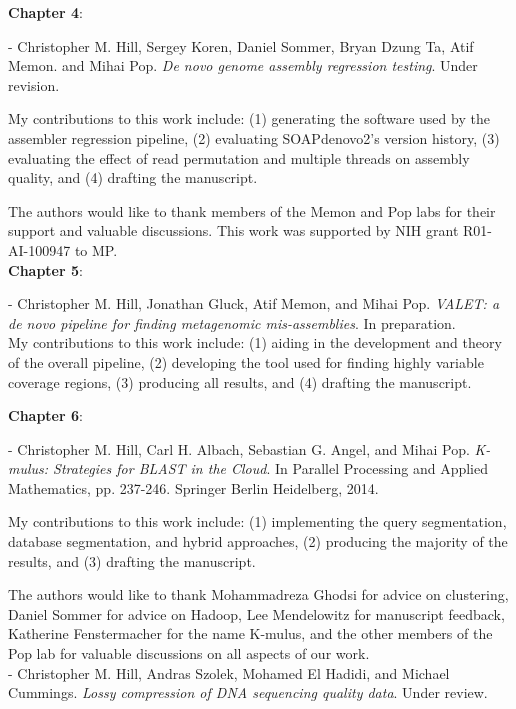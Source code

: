 \documentclass[12pt,\mydriver]{thesis}
\begin{document}
\noindent\textbf{Chapter 4}:

\noindent - Christopher M. Hill, Sergey Koren, Daniel Sommer, Bryan Dzung Ta, Atif Memon. and Mihai Pop. \textit{De novo genome assembly regression testing}. Under revision.

My contributions to this work include: (1) generating the software used by the assembler regression pipeline, (2) evaluating SOAPdenovo2's version history, (3) evaluating the effect of read permutation and multiple threads on assembly quality, and (4) drafting the manuscript.

The authors would like to thank members of the Memon and Pop labs for their support and valuable discussions. This work was supported by NIH grant R01-AI-100947 to MP. \\

\noindent\textbf{Chapter 5}:

\noindent - Christopher M. Hill, Jonathan Gluck, Atif Memon, and Mihai Pop. \textit{VALET: a de novo pipeline for finding metagenomic mis-assemblies}. In preparation. \\

My contributions to this work include: (1) aiding in the development and theory of the overall pipeline, (2) developing the tool used for finding highly variable coverage regions, (3) producing all results, and (4) drafting the manuscript.

\noindent\textbf{Chapter 6}:

\noindent - Christopher M. Hill, Carl H. Albach, Sebastian G. Angel, and Mihai Pop. \textit{K-mulus: Strategies for BLAST in the Cloud}. In Parallel Processing and Applied Mathematics, pp. 237-246. Springer Berlin Heidelberg, 2014.

My contributions to this work include: (1) implementing the query segmentation, database segmentation, and hybrid approaches, (2) producing the majority of the results, and (3) drafting the manuscript.

The authors would like to thank Mohammadreza Ghodsi for advice on clustering, Daniel Sommer for advice on Hadoop, Lee Mendelowitz for manuscript feedback, Katherine Fenstermacher for the name K-mulus, and the other members of the Pop lab for valuable discussions on all aspects of our work. \\

\noindent - Christopher M. Hill, Andras Szolek, Mohamed El Hadidi, and Michael Cummings. \textit{Lossy compression of DNA sequencing quality data}. Under review.
\end{document}
